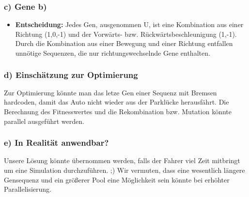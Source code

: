 \documentclass{beamer}
\begin{document}
\begin{frame}
  \frametitle{\textbf{c)} Gene b)}
  \begin{itemize}
    
    \item \textbf{Entscheidung:} Jedes Gen, ausgenommen U, ist eine Kombination aus einer Richtung (1,0,-1) und der Vorwärts- bzw. R\"uckw\"artsbeschleunigung (1,-1). Durch die Kombination aus einer Bewegung und einer Richtung entfallen unnötige Sequenzen, die nur richtungswechselnde Gene enthalten.
  \end{itemize}
\end{frame}

\begin{frame}
  \frametitle{\textbf{d)} Einsch\"atzung zur Optimierung}
  Zur Optimierung könnte man das letze Gen einer Sequenz mit Bremsen hardcoden, damit das Auto nicht wieder aus der Parklücke herausfährt.
  Die Berechnung des Fitnesswertes und die Rekombination bzw. Mutation könnte parallel ausgeführt werden.
\end{frame}

\begin{frame}
  \frametitle{\textbf{e)} In Realit\"at anwendbar?}
  Unsere Lösung könnte übernommen werden, falls der Fahrer viel Zeit mitbringt um eine Simulation durchzuführen. ;)   Wir vermuten, dass eine wesentlich längere Gensequenz und ein größerer Pool eine Möglichkeit sein könnte bei erhöhter Parallelisierung.
\end{frame}
\end{document}
